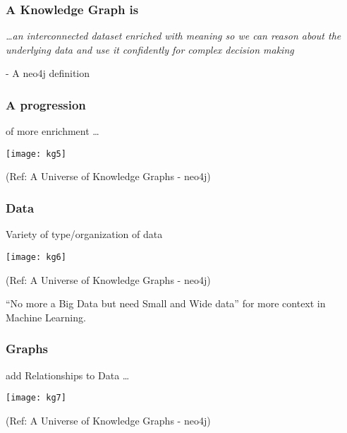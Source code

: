 \begin{frame}[fragile]\frametitle{A Knowledge Graph is}
 
\begin{center}
{\em \ldots an interconnected dataset enriched with meaning so we can reason about the underlying data and use it confidently for complex decision making}
\end{center}

	  - A neo4j definition
		
\end{frame}


\begin{frame}[fragile]\frametitle{A progression}
 
 of more enrichment \ldots
 
			\begin{center}
			\texttt{[image: kg5]}
			\end{center}	
			
			{\tiny (Ref: A Universe of Knowledge Graphs - neo4j)}
		
\end{frame}

\begin{frame}[fragile]\frametitle{Data}
 
 Variety of type/organization of data
 
			\begin{center}
			\texttt{[image: kg6]}
			\end{center}	
			
			{\tiny (Ref: A Universe of Knowledge Graphs - neo4j)}
		
		
		``No more a Big Data but need Small and Wide data'' for more context in Machine Learning.
		
\end{frame}

\begin{frame}[fragile]\frametitle{Graphs}
 
 add Relationships to Data \ldots
 
 
			\begin{center}
			\texttt{[image: kg7]}
			\end{center}	
			
			{\tiny (Ref: A Universe of Knowledge Graphs - neo4j)}
		
		
\end{frame}

